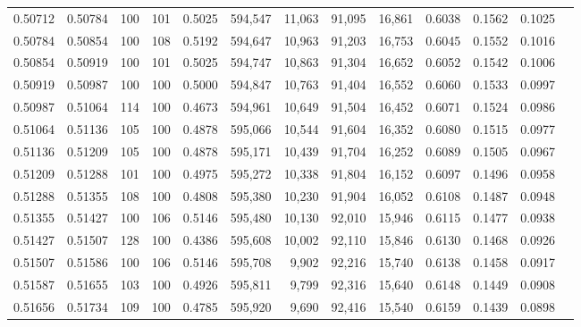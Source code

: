 \begin{tabular}{rrrrrrrrrrrrr}
0.50712 & 0.50784 &   100 & 101 &                                     0.5025 & 594,547 &  11,063 &  91,095 &  16,861 & 0.6038 & 0.1562 & 0.1025 \\
0.50784 & 0.50854 &   100 & 108 &                                     0.5192 & 594,647 &  10,963 &  91,203 &  16,753 & 0.6045 & 0.1552 & 0.1016 \\
0.50854 & 0.50919 &   100 & 101 &                                     0.5025 & 594,747 &  10,863 &  91,304 &  16,652 & 0.6052 & 0.1542 & 0.1006 \\
0.50919 & 0.50987 &   100 & 100 &                                     0.5000 & 594,847 &  10,763 &  91,404 &  16,552 & 0.6060 & 0.1533 & 0.0997 \\
0.50987 & 0.51064 &   114 & 100 &                                     0.4673 & 594,961 &  10,649 &  91,504 &  16,452 & 0.6071 & 0.1524 & 0.0986 \\
0.51064 & 0.51136 &   105 & 100 &                                     0.4878 & 595,066 &  10,544 &  91,604 &  16,352 & 0.6080 & 0.1515 & 0.0977 \\
0.51136 & 0.51209 &   105 & 100 &                                     0.4878 & 595,171 &  10,439 &  91,704 &  16,252 & 0.6089 & 0.1505 & 0.0967 \\
0.51209 & 0.51288 &   101 & 100 &                                     0.4975 & 595,272 &  10,338 &  91,804 &  16,152 & 0.6097 & 0.1496 & 0.0958 \\
0.51288 & 0.51355 &   108 & 100 &                                     0.4808 & 595,380 &  10,230 &  91,904 &  16,052 & 0.6108 & 0.1487 & 0.0948 \\
0.51355 & 0.51427 &   100 & 106 &                                     0.5146 & 595,480 &  10,130 &  92,010 &  15,946 & 0.6115 & 0.1477 & 0.0938 \\
0.51427 & 0.51507 &   128 & 100 &                                     0.4386 & 595,608 &  10,002 &  92,110 &  15,846 & 0.6130 & 0.1468 & 0.0926 \\
0.51507 & 0.51586 &   100 & 106 &                                     0.5146 & 595,708 &   9,902 &  92,216 &  15,740 & 0.6138 & 0.1458 & 0.0917 \\
0.51587 & 0.51655 &   103 & 100 &                                     0.4926 & 595,811 &   9,799 &  92,316 &  15,640 & 0.6148 & 0.1449 & 0.0908 \\
0.51656 & 0.51734 &   109 & 100 &                                     0.4785 & 595,920 &   9,690 &  92,416 &  15,540 & 0.6159 & 0.1439 & 0.0898 \\

\end{tabular}

